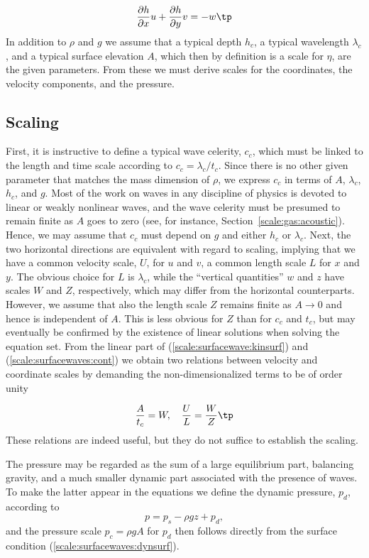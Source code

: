\documentclass[graybox,envcountchap,sectrefs,final]{svmonodo}
\begin{document}
\[
\label{scale:surfacewave:kinbott}
\frac{\partial h}{\partial x}u+\frac{\partial h}{\partial y}v =-w\tp
\]
In addition to $\rho$ and  $g$ we assume that a typical depth $h_c$,
a typical wavelength $\lambda_c$, and a typical surface elevation $A$, which
then by definition is a scale for $\eta$, are
the given parameters. From these we must derive scales for the coordinates, the velocity components, and the pressure.

\subsection{Scaling}

First, it is instructive to define a typical wave celerity, $c_c$, which
must be linked to the length and time scale according to $c_c=\lambda_c/t_c$.
Since there is no other given parameter that matches the mass dimension of
$\rho$, we express $c_c$ in terms of $A$, $\lambda_c$, $h_c$, and $g$.
Most of the work on waves in any discipline of physics is devoted to linear
or weakly nonlinear waves, and the wave celerity must be presumed to remain
finite as $A$ goes to zero (see, for instance, Section~\ref{scale:gas:acoustic}).
Hence, we may assume  that $c_c$ must depend on $g$ and either $h_c$ or $\lambda_c$. Next, the two horizontal directions are equivalent with regard to
scaling, implying that
we have a common velocity scale, $U$, for $u$ and $v$, a common length scale $L$
for $x$ and $y$. The obvious choice for $L$ is $\lambda_c$, while
the ``vertical quantities'' $w$ and $z$ have scales $W$ and $Z$, respectively, which may differ from the horizontal counterparts.
However, we assume that also the length scale $Z$ remains finite
as $A\rightarrow 0$ and hence is independent of $A$. This is less
obvious for $Z$ than for $c_c$ and $t_c$, but may eventually
be confirmed by the existence
of linear solutions when solving the equation set.
From the linear part of (\ref{scale:surfacewave:kinsurf}) and (\ref{scale:surfacewaves:cont}) we obtain two relations between velocity and coordinate scales by demanding the non-dimensionalized terms to be of order unity

\begin{equation}
\label{scale:surfacewaves:scalrelations}
\frac{A}{t_c} = W,\quad \frac{U}{L}=\frac{W}{Z}\tp
\end{equation}
These relations are indeed useful, but they do not suffice to establish the scaling.

The pressure may be regarded as the sum of a large equilibrium part, balancing
gravity, and a much smaller dynamic part associated with the presence of
waves. To make the latter appear in the equations we define the
dynamic pressure, $p_d$, according to
\[ p=p_s-\rho g z +p_d,\]
and the pressure scale $p_c=\rho g A$ for $p_d$ then follows directly from
the surface condition (\ref{scale:surfacewaves:dynsurf}).
\end{document}
